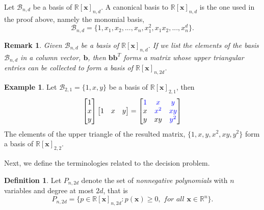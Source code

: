\documentclass[12pt]{amsart}
\numberwithin{equation}{section}
\newtheorem{remark}[thm]{Remark}
\theoremstyle{definition}
\newtheorem{definition}[thm]{Definition}
\newtheorem{example}[thm]{Example}
\numberwithin{thm}{section}
\begin{document}
Let $\mathcal{B}_{n, d}$ be a basis of $\mathbb{R}[\mathbf{x}]_{n, d}$. 
A canonical basis to $\mathbb{R}[\mathbf{x}]_{n, d}$ is the one used in the proof above, 
namely the monomial basis,
\begin{equation*}
     \mathcal{B}_{n, d} = \{1, x_1, x_2, ..., x_n, x_1 ^ 2, x_1 x_2, ..., x_n^d\}.
\end{equation*}

\begin{remark}
     \label{rem:upgrade}
     Given $\mathcal{B}_{n, d}$ be a basis of $\mathbb{R}[\mathbf{x}]_{n, d}$. 
     If we list the elements of the basis $\mathcal{B}_{n, d}$ in a column vector, $\mathbf{b}$, 
     then $\mathbf{b} \mathbf{b}^T$ forms a matrix whose upper triangular
     entries can be collected to form a basis of $\mathbb{R}[\mathbf{x}]_{n, 2d}$.
\end{remark}

\begin{example}
     Let $\mathcal{B}_{2, 1} = \{1, x, y\}$ be a basis of $\mathbb{R}[\mathbf{x}]_{2, 1}$, then 
     \begin{equation*}
          \begin{bmatrix}
               1 \\
               x \\
               y
          \end{bmatrix}
          \begin{bmatrix}
               1 & x & y
          \end{bmatrix}
          = \begin{bmatrix}
               \color{blue} 1 & \color{blue}x & \color{blue}y \\
               x & \color{blue}x^2 & \color{blue}xy \\
               y & xy & \color{blue}y^2 \\
          \end{bmatrix}
     \end{equation*}
     The elements of the upper triangle of the resulted matrix, $\{1, x, y, x^2, xy, y^2\}$ form a basis of $\mathbb{R}[\mathbf{x}]_{2, 2}$.
\end{example}

\smallskip

Next, we define the terminologies related to the decision problem.

\begin{definition}
     \label{def:NGP}
     Let $P_{n, 2d}$ denote the set of \emph{nonnegative polynomials} with 
     $n$ variables and degree at most $2d$, that is 
     \begin{equation*}
          P_{n, 2d} = \{ p \in \mathbb{R}[\mathbf{x}]_{n, 2d}: p(\mathbf{x}) \geq 0, \textit{ for all } \mathbf{x} \in \mathbb{R}^n \}.
     \end{equation*}
\end{definition}
\end{document}
